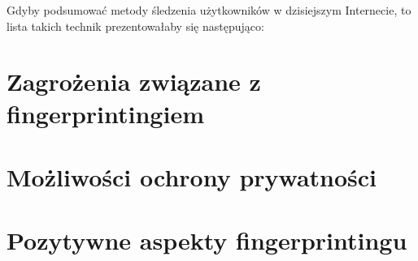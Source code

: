 Gdyby podsumować metody śledzenia użytkowników w dzisiejszym Internecie, to
lista takich technik prezentowałaby się następująco:

\section{Zagrożenia związane z fingerprintingiem}

\section{Możliwości ochrony prywatności}

\section{Pozytywne aspekty fingerprintingu}
